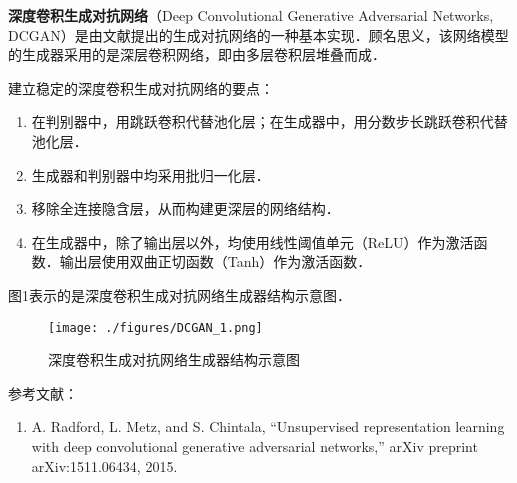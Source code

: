 
\textbf{深度卷积生成对抗网络}（Deep Convolutional Generative Adversarial Networks, DCGAN）是由文献\cite{DCGAN}提出的生成对抗网络的一种基本实现．顾名思义，该网络模型的生成器采用的是深层卷积网络，即由多层卷积层堆叠而成．

建立稳定的深度卷积生成对抗网络的要点\cite{DCGAN}：
\begin{enumerate}
\item 在判别器中，用跳跃卷积代替池化层；在生成器中，用分数步长跳跃卷积代替池化层．
\item 生成器和判别器中均采用批归一化层．
\item 移除全连接隐含层，从而构建更深层的网络结构．
\item 在生成器中，除了输出层以外，均使用线性阈值单元（ReLU）作为激活函数．输出层使用双曲正切函数（Tanh）作为激活函数．
\end{enumerate}


图1表示的是深度卷积生成对抗网络生成器结构示意图．
\begin{figure}[ht]
\centering
\texttt{[image: ./figures/DCGAN\_1.png]}
\caption{深度卷积生成对抗网络生成器结构示意图 \cite{DCGAN}} \label{DCGAN_fig1}
\end{figure}







参考文献：
\begin{enumerate}
\item A. Radford, L. Metz, and S. Chintala, “Unsupervised representation learning with deep convolutional generative adversarial networks,” arXiv preprint arXiv:1511.06434, 2015.
\end{enumerate}